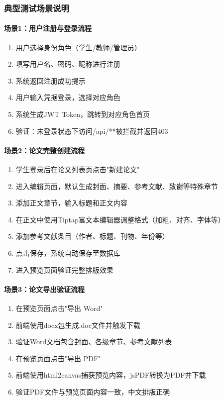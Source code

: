 \documentclass[a4paper,12pt]{article}
\begin{document}
\subsubsection{典型测试场景说明}
\paragraph{场景1：用户注册与登录流程}
\begin{enumerate}
  \item 用户选择身份角色（学生/教师/管理员）
  \item 填写用户名、密码、昵称进行注册
  \item 系统返回注册成功提示
  \item 用户输入凭据登录，选择对应角色
  \item 系统生成JWT Token，跳转到对应角色首页
  \item 验证：未登录状态下访问/api/**被拦截并返回403
\end{enumerate}

\paragraph{场景2：论文完整创建流程}
\begin{enumerate}
  \item 学生登录后在论文列表页点击"新建论文"
  \item 进入编辑页面，默认生成封面、摘要、参考文献、致谢等特殊章节
  \item 添加正文章节，输入标题和正文内容
  \item 在正文中使用Tiptap富文本编辑器调整格式（加粗、对齐、字体等）
  \item 添加参考文献条目（作者、标题、刊物、年份等）
  \item 点击保存，系统自动保存至数据库
  \item 进入预览页面验证完整排版效果
\end{enumerate}

\paragraph{场景3：论文导出验证流程}
\begin{enumerate}
  \item 在预览页面点击"导出 Word"
  \item 前端使用docx包生成.doc文件并触发下载
  \item 验证Word文档包含封面、各级章节、参考文献列表
  \item 在预览页面点击"导出 PDF"
  \item 前端使用html2canvas捕获预览内容，jsPDF转换为PDF并下载
  \item 验证PDF文件与预览页面内容一致，中文排版正确
\end{enumerate}
\end{document}
